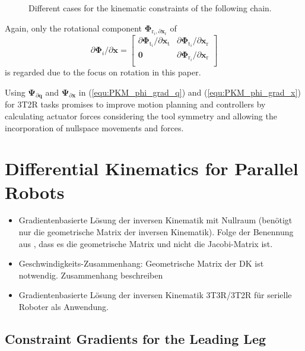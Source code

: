\documentclass[robotics,article,submit,moreauthors,pdftex]{Definitions/mdpi}
\newcommand{\bm}[1]{\boldsymbol{#1}}
\begin{document}
\begin{figure}[tb]
    
    \caption{Different cases for the kinematic constraints of the following chain.}
    \label{fig:pkm_constr_rot_follow}
\end{figure} 




Again, only the rotational component $\bm{\Phi}_{\mathrm{r}_i,\partial \bm{x}_{\mathrm{r}}}$ of 
%
\begin{equation}
\partial \bm{\Phi}_i/\partial \bm{x}
=
\begin{bmatrix}
\partial\bm{\Phi}_{\mathrm{t}_i}/\partial \bm{x}_{\mathrm{t}} & \partial\bm{\Phi}_{\mathrm{t}_i}/\partial \bm{x}_{\mathrm{r}} \\
\bm{0} & \partial\bm{\Phi}_{\mathrm{r}_i}/\partial \bm{x}_{\mathrm{r}} \\
\end{bmatrix}
\end{equation}
is regarded due to the focus on rotation in this paper.

Using $\bm{\Psi}_{\partial \bm{q}}$ and $\bm{\Psi}_{\partial \bm{x}}$ in (\ref{equ:PKM_phi_grad_q}) and (\ref{equ:PKM_phi_grad_x}) for 3T2R tasks promises to improve motion planning and controllers by calculating actuator forces considering the tool symmetry and allowing the incorporation of nullspace movements and forces.


\section{Differential Kinematics for Parallel Robots}
\label{sec:ZB_Anwendung}

\begin{itemize}
    \item Gradientenbasierte Lösung der inversen Kinematik mit Nullraum (benötigt nur die geometrische Matrix der inversen Kinematik). Folge der Benennung aus \cite{Gogu2008}, dass es die geometrische Matrix und nicht die Jacobi-Matrix ist.
    \item Geschwindigkeits-Zusammenhang: Geometrische Matrix der DK ist notwendig. Zusammenhang beschreiben
    \item Gradientenbasierte Lösung der inversen Kinematik 3T3R/3T2R für serielle Roboter als Anwendung.
\end{itemize}

\subsection{Constraint Gradients for the Leading Leg}
\end{document}
